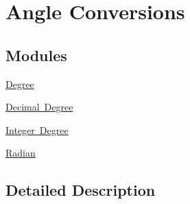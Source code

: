 \hypertarget{group___e_g_x_math-_angle_conversions}{}\section{Angle Conversions}
\label{group___e_g_x_math-_angle_conversions}
\subsection*{Modules}
\begin{DoxyCompactItemize}
\item 
\mbox{\hyperlink{group___e_g_x_math-_angle_conversions-_degree}{Degree}}
\item 
\mbox{\hyperlink{group___e_g_x_math-_angle_conversions-_decimal_degree}{Decimal Degree}}
\item 
\mbox{\hyperlink{group___e_g_x_math-_angle_conversions-_integer_degree}{Integer Degree}}
\item 
\mbox{\hyperlink{group___e_g_x_math-_angle_conversions-_radian}{Radian}}
\end{DoxyCompactItemize}


\subsection{Detailed Description}
